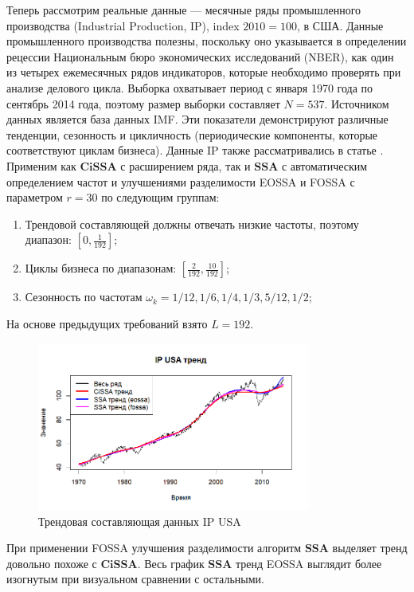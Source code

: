 \documentclass[a4paper, 11pt]{article}
\newcommand{\SSA}{\textbf{SSA}}
\newcommand{\CISSA}{\textbf{CiSSA}}
\begin{document}
Теперь рассмотрим реальные данные --- месячные ряды промышленного производства (Industrial Production, IP), index $2010 = 100$, в США. Данные промышленного производства полезны, поскольку оно указывается в определении рецессии Национальным бюро экономических исследований (NBER), как один из четырех ежемесячных рядов индикаторов, которые необходимо проверять при анализе делового цикла. Выборка охватывает период с января 1970 года по сентябрь 2014 года, поэтому размер выборки составляет $N = 537$. Источником данных является база данных IMF. Эти показатели демонстрируют различные тенденции, сезонность и цикличность (периодические компоненты, которые соответствуют циклам бизнеса). Данные IP также рассматривались в статье \cite{bogalo2020}.
Применим как $\CISSA$ с расширением ряда, так и $\SSA$ с автоматическим определением частот и улучшениями разделимости EOSSA и FOSSA с параметром $r = 30$ по следующим группам:
\begin{enumerate}
	\item Трендовой составляющей должны отвечать низкие частоты, поэтому диапазон: $\left[0, \frac{1}{192}\right]$;
	\item Циклы бизнеса по диапазонам: $\left[\frac{2}{192}, \frac{10}{192}\right]$;
	\item Сезонность по частотам $\omega_k = 1/12, 1/6, 1/4, 1/3, 5/12, 1/2$;
\end{enumerate}
На основе предыдущих требований взято $L = 192$.

\begin{figure}[H]
	\centering
	\includegraphics[width=0.8\textwidth]{img/trend inseparability example/IP_trend.png}
	\caption{Трендовая составляющая данных IP USA}
	\label{fig:IP_trend}
\end{figure}

При применении FOSSA улучшения разделимости алгоритм $\SSA$ выделяет тренд довольно похоже с $\CISSA$. Весь график $\SSA$ тренд EOSSA выглядит более изогнутым при визуальном сравнении с остальными.
\end{document}
